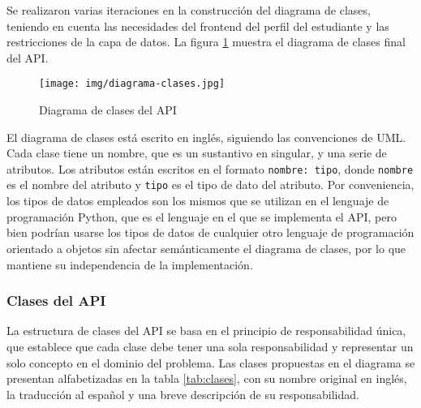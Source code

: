 Se realizaron varias iteraciones en la construcción del diagrama de clases, teniendo en cuenta las necesidades del frontend del perfil del estudiante y las restricciones de la capa de datos. La figura \ref{fig:diagrama_clases} muestra el diagrama de clases final del \gls{API}.

\begin{figure}[h]
	\centering
	\texttt{[image: img/diagrama-clases.jpg]}
	\caption{Diagrama de clases del \gls{API}}
	\label{fig:diagrama_clases}
\end{figure}

El diagrama de clases está escrito en inglés, siguiendo las convenciones de \gls{UML}. Cada clase tiene un nombre, que es un sustantivo en singular, y una serie de atributos. Los atributos están escritos en el formato \texttt{nombre: tipo}, donde \texttt{nombre} es el nombre del atributo y \texttt{tipo} es el tipo de dato del atributo. Por conveniencia, los tipos de datos empleados son los mismos que se utilizan en el lenguaje de programación \gls{Python}, que es el lenguaje en el que se implementa el \gls{API}, pero bien podrían usarse los tipos de datos de cualquier otro lenguaje de programación orientado a objetos sin afectar semánticamente el diagrama de clases, por lo que mantiene su independencia de la implementación.

\subsubsection{Clases del API}

La estructura de clases del \gls{API} se basa en el principio de responsabilidad única, que establece que cada clase debe tener una sola responsabilidad y representar un solo concepto en el dominio del problema. Las clases propuestas en el diagrama se presentan alfabetizadas en la tabla \ref{tab:clases}, con su nombre original en inglés, la traducción al español y una breve descripción de su responsabilidad.

